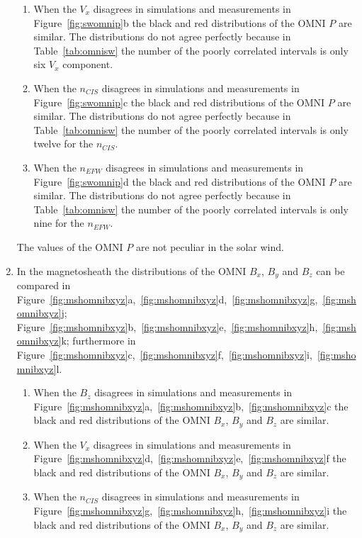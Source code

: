 \documentclass[linenumbers,draft]{agujournal}
\begin{document}
\begin{enumerate}
\begin{enumerate}
\item When the $V_{x}$ disagrees in simulations and measurements in Figure~\ref{fig:swomnip}b the black and red distributions of the OMNI $P$ are similar. The distributions do not agree perfectly because in Table~\ref{tab:omnisw} the number of the poorly correlated intervals is only six $V_{x}$ component.

\item When the $n_{CIS}$ disagrees in simulations and measurements in Figure~\ref{fig:swomnip}c the black and red distributions of the OMNI $P$ are similar. The distributions do not agree perfectly because in Table~\ref{tab:omnisw} the number of the poorly correlated intervals is only twelve for the $n_{CIS}$.

\item When the $n_{EFW}$ disagrees in simulations and measurements in Figure~\ref{fig:swomnip}d the black and red distributions of the OMNI $P$ are similar. The distributions do not agree perfectly because in Table~\ref{tab:omnisw} the number of the poorly correlated intervals is only nine for the $n_{EFW}$.
\end{enumerate}
The values of the OMNI $P$ are not peculiar in the solar wind. 

\item In the magnetosheath the distributions of the OMNI $B_{x}$, $B_{y}$ and $B_{z}$ can be compared in Figure~\ref{fig:mshomnibxyz}a,~\ref{fig:mshomnibxyz}d,~\ref{fig:mshomnibxyz}g,~\ref{fig:mshomnibxyz}j; Figure~\ref{fig:mshomnibxyz}b,~\ref{fig:mshomnibxyz}e,~\ref{fig:mshomnibxyz}h,~\ref{fig:mshomnibxyz}k; furthermore in Figure~\ref{fig:mshomnibxyz}c,~\ref{fig:mshomnibxyz}f,~\ref{fig:mshomnibxyz}i,~\ref{fig:mshomnibxyz}l. 
\begin{enumerate}
\item When the $B_{z}$ disagrees in simulations and measurements in Figure~\ref{fig:mshomnibxyz}a,~\ref{fig:mshomnibxyz}b,~\ref{fig:mshomnibxyz}c the black and red distributions of the OMNI $B_{x}$, $B_{y}$ and $B_{z}$ are similar.

\item When the $V_{x}$ disagrees in simulations and measurements in Figure~\ref{fig:mshomnibxyz}d,~\ref{fig:mshomnibxyz}e,~\ref{fig:mshomnibxyz}f the black and red distributions of the OMNI $B_{x}$, $B_{y}$ and $B_{z}$ are similar.
 
\item When the $n_{CIS}$ disagrees in simulations and measurements in Figure~\ref{fig:mshomnibxyz}g,~\ref{fig:mshomnibxyz}h,~\ref{fig:mshomnibxyz}i the black and red distributions of the OMNI $B_{x}$, $B_{y}$ and $B_{z}$ are similar.


\end{enumerate}
\end{enumerate}
\end{document}
